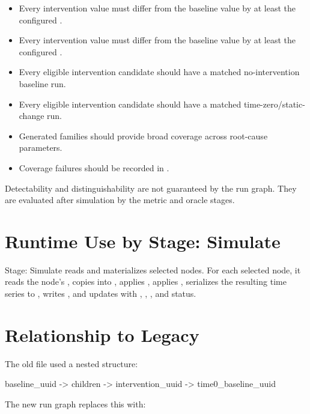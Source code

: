 \documentclass[11pt]{article}
\begin{document}
\begin{itemize}
\item Every intervention value must differ from the baseline value by at least the configured \termMinAbsDist{}.
\item Every intervention value must differ from the baseline value by at least the configured \termMinSRDDistance{}.
\item Every eligible intervention candidate should have a matched no-intervention baseline run.
\item Every eligible intervention candidate should have a matched time-zero/static-change run.
\item Generated families should provide broad coverage across root-cause parameters.
\item Coverage failures should be recorded in .
\end{itemize}

Detectability and distinguishability are not guaranteed by the run graph.
They are evaluated after simulation by the metric and oracle stages.

\section*{Runtime Use by Stage: Simulate}

Stage: Simulate reads  and materializes selected nodes.
For each selected node, it reads the node's , copies  into , applies , applies , serializes the resulting time series to , writes , and updates  with , , , and status.

\section*{Relationship to Legacy \texorpdfstring{}{model\_run\_specs.json}}

The old  file used a nested structure:

\begin{DocCode}
baseline_uuid -> children -> intervention_uuid -> time0_baseline_uuid
\end{DocCode}

The new run graph replaces this with:
\end{document}
